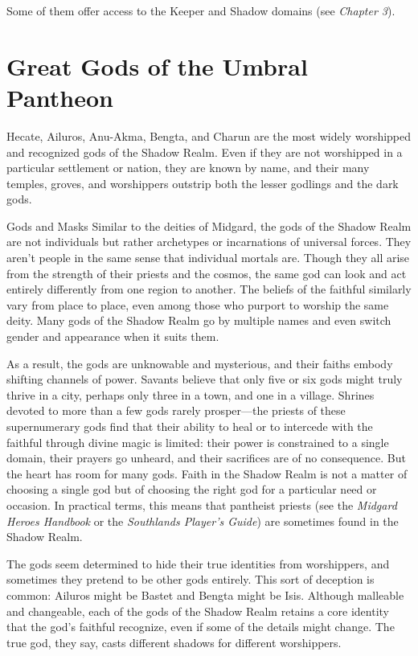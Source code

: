 \documentclass[10pt,a4paper,twoside,bg=print,twocolumn,openany,nodeprecatedcode]{dndbook}
\begin{document}
Some of them offer access to the Keeper and Shadow domains (see \textit{Chapter 3}).

\section{Great Gods of the Umbral Pantheon}
Hecate, Ailuros, Anu-Akma, Bengta, and Charun are the most widely worshipped and recognized gods of the Shadow Realm. Even if they are not worshipped in a particular settlement or nation, they are known by name, and their many temples, groves, and worshippers outstrip both the lesser godlings and the dark gods.

\begin{DndSidebar}[float=!b]{Gods and Masks}
Similar to the deities of Midgard, the gods of the Shadow Realm are not individuals but rather archetypes or incarnations of universal forces. They aren't people in the same sense that individual mortals are. Though they all arise from the strength of their priests and the cosmos, the same god can look and act entirely differently from one region to another. The beliefs of the faithful similarly vary from place to place, even among those who purport to worship the same deity. Many gods of the Shadow Realm go by multiple names and even switch gender and appearance when it suits them.



As a result, the gods are unknowable and mysterious, and their faiths embody shifting channels of power. Savants believe that only five or six gods might truly thrive in a city, perhaps only three in a town, and one in a village. Shrines devoted to more than a few gods rarely prosper—the priests of these supernumerary gods find that their ability to heal or to intercede with the faithful through divine magic is limited: their power is constrained to a single domain, their prayers go unheard, and their sacrifices are of no consequence. But the heart has room for many gods. Faith in the Shadow Realm is not a matter of choosing a single god but of choosing the right god for a particular need or occasion. In practical terms, this means that pantheist priests (see the \textit{Midgard Heroes Handbook} or the \textit{Southlands Player's Guide}) are sometimes found in the Shadow Realm.



The gods seem determined to hide their true identities from worshippers, and sometimes they pretend to be other gods entirely. This sort of deception is common: Ailuros might be Bastet and Bengta might be Isis. Although malleable and changeable, each of the gods of the Shadow Realm retains a core identity that the god's faithful recognize, even if some of the details might change. The true god, they say, casts different shadows for different worshippers.



\end{DndSidebar}
\end{document}
